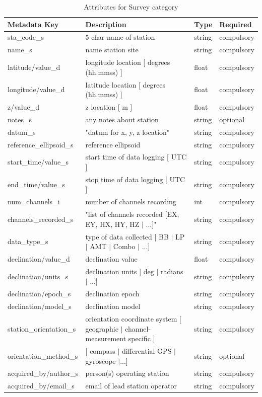 \documentclass{article}
\begin{document}
\begin{table}[htb!]
	\caption[Attributes for Survey]{Attributes for Survey category}
	\begin{tabular}{|l|p{3in}|l|l|}
		\hline
		\textbf{Metadata Key} & \textbf{Description} & \textbf{Type} & \textbf{Required} \\ \hline
		sta\_code\_s & 5 char name of station & string & compulsory \\ \hline
		name\_s & name station site & string & compulsory \\ \hline
		latitude/value\_d & longitude location [ degrees (hh.mmss) ] & float & compulsory \\ \hline
		longitude/value\_d & latitude location [ degrees (hh.mmss) ] & float & compulsory \\ \hline
		z/value\_d & z location [ m ] & float & compulsory \\ \hline
		notes\_s & any notes about station & string & optional \\ \hline
		datum\_s & "datum for x, y, z location" & string & compulsory \\ \hline
		reference\_ellipsoid\_s & reference ellipsoid & string & compulsory \\ \hline
		start\_time/value\_s & start time of data logging [ UTC ] & string & compulsory \\ \hline
		end\_time/value\_s & stop time of data logging  [ UTC ] & string & compulsory \\ \hline
		num\_channels\_i & number of channels recording & int & compulsory \\ \hline
		channels\_recorded\_s & "list of channels recorded [EX, EY, HX, HY, HZ $|$ ...]" & string & compulsory \\ \hline
		data\_type\_s & type of data collected [ BB $|$ LP $|$ AMT $|$ Combo $|$ ...] & string & compulsory \\ \hline
		declination/value\_d & declination value & float & compulsory \\ \hline
		declination/units\_s & declination units [ deg $|$ radians $|$ ...] & string & compulsory \\ \hline
		declination/epoch\_s & declination epoch & string & compulsory \\ \hline
		declination/model\_s & declination model & string & compulsory \\ \hline
		station\_orientation\_s & orientation coordinate system [ geographic $|$ channel-measurement specific ] & string & compulsory \\ \hline
		orientation\_method\_s & [ compass $|$ differential GPS $|$ gyroscope $|$...] & string & optional \\ \hline
		acquired\_by/author\_s & person(s) operating station & string & compulsory \\ \hline
		acquired\_by/email\_s & email of lead station operator & string & compulsory \\ \hline
	\end{tabular}
\label{tab:station01}
\end{table}	
\end{document}
